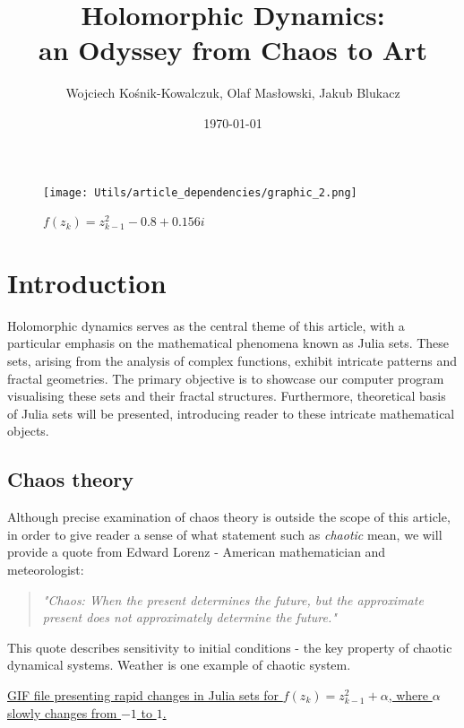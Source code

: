 \documentclass{article}
\title{
	\Huge Holomorphic Dynamics: \\ 
	{\huge an Odyssey from Chaos to Art} 
}
\author{Wojciech Kośnik-Kowalczuk, Olaf Masłowski, Jakub Blukacz}
\date{\today}
\begin{document}
\maketitle
\thispagestyle{empty}
\begin{figure}[H]
	\centering
	\texttt{[image: Utils/article\_dependencies/graphic\_2.png]}
	\caption{\footnotesize $f(z_k) = z_{k-1}^2 -0.8 + 0.156i$}
\end{figure}
\newpage
\thispagestyle{empty}
\tableofcontents
\newpage

\section{Introduction}
Holomorphic dynamics serves as the central theme of this article, with a particular emphasis on the mathematical phenomena known as Julia sets. These sets, arising from the analysis of complex functions, exhibit intricate patterns and fractal geometries. The primary objective is to showcase our computer program visualising these sets and their fractal structures. Furthermore, theoretical basis of Julia sets will be presented, introducing reader to these intricate mathematical objects.

\subsection{Chaos theory}
Although precise examination of chaos theory is outside the scope of this article, in order to give reader a sense of what statement such as \textit{chaotic} mean, we will provide a quote from Edward Lorenz - American mathematician and\\meteorologist:
\begin{quote}
	\textit{"Chaos: When the present determines the future, but the approximate present does not approximately determine the future\cite{zotero-29}."}
\end{quote}
This quote describes sensitivity to initial conditions - the key property of chaotic dynamical systems. Weather is one example of chaotic system.
\begin{center}
	\footnotesize
	\href{run:Utils/article_dependencies/graphic_5.gif}{GIF file presenting rapid changes in Julia sets for \(f(z_{k}) = z_{k-1}^{2} + \alpha\), where \(\alpha\) slowly changes from \(-1\) to \(1\).}

\end{center}
\end{document}
